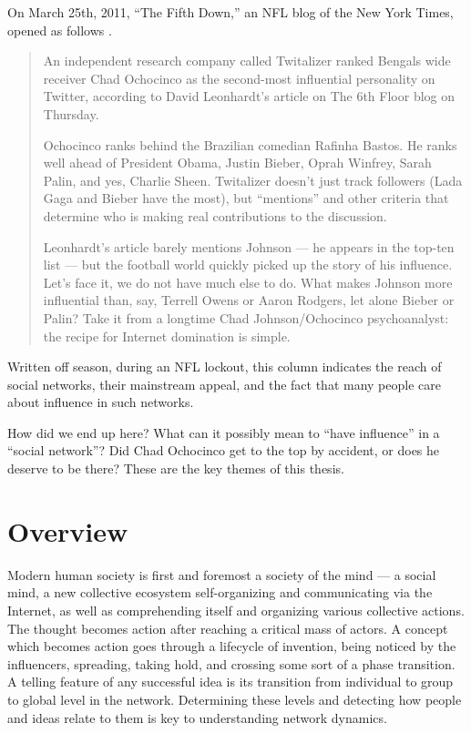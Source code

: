 \documentclass[10pt,oneside]{memoir}
\begin{document}
\begin{Spacing}{2}


On March 25th, 2011, ``The Fifth Down,'' an NFL blog of the New York Times, opened as follows \cite{tanier2011ochocinco}.


\begin{quote}
An independent research company called Twitalizer ranked Bengals wide receiver Chad Ochocinco as the second-most influential personality on Twitter, according to David Leonhardt's article on The 6th Floor blog on Thursday.


Ochocinco ranks behind the Brazilian comedian Rafinha Bastos. He ranks well ahead of President Obama, Justin Bieber, Oprah Winfrey, Sarah Palin, and yes, Charlie Sheen. Twitalizer doesn't just track followers (Lada Gaga and Bieber have the most), but ``mentions'' and other criteria that determine who is making real contributions to the discussion.


Leonhardt's article barely mentions Johnson --- he appears in the top-ten list --- but the football world quickly picked up the story of his influence. Let's face it, we do not have much else to do. What makes Johnson more influential than, say, Terrell Owens or Aaron Rodgers, let alone Bieber or Palin? Take it from a longtime Chad Johnson/Ochocinco psychoanalyst: the recipe for Internet domination is simple.
\end{quote}


Written off season, during an NFL lockout, this column indicates the reach of social networks, their mainstream appeal, and the fact that many people care about influence in such networks.


How did we end up here?  What can it possibly mean to ``have influence'' in a ``social network''?  Did Chad Ochocinco get to the top by accident, or does he deserve to be there?  These are the key themes of this thesis.


\pagebreak \section{Overview}
\label{overview}

Modern human society is first and foremost a society of the mind --- a social mind, a new collective ecosystem self-organizing and communicating via the Internet, as well as comprehending itself and organizing various collective actions.  The thought becomes action after reaching a critical mass of actors.   A concept which becomes action goes through a lifecycle of invention, being noticed by the influencers, spreading, taking hold, and crossing some sort of a phase transition.  A telling feature of any successful idea is its transition from individual to group to global level in the network.  Determining these levels and detecting how people and ideas relate to them is key to understanding network dynamics.



\end{Spacing}
\end{document}
